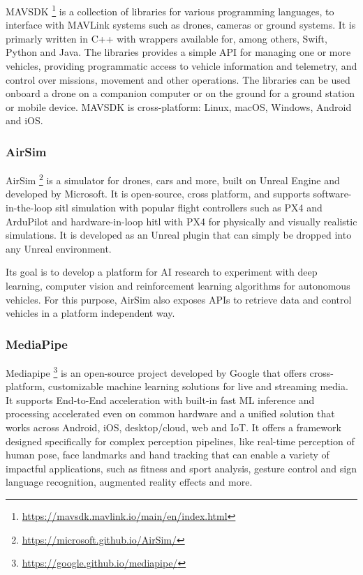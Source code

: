 MAVSDK \footnote{\url{https://mavsdk.mavlink.io/main/en/index.html}} is a collection of libraries for various programming languages,
to interface with MAVLink systems such as drones, cameras or ground systems.
It is primarly written in C++ with wrappers available for,
among others, Swift, Python and Java.
The libraries provides a simple API for managing one or more vehicles, 
providing programmatic access to vehicle information and telemetry, 
and control over missions, movement and other operations.
The libraries can be used onboard a drone on a companion computer
or on the ground for a ground station or mobile device.
MAVSDK is cross-platform: Linux, macOS, Windows, Android and iOS.


\subsubsection{AirSim}
\label{subsec:airsim}
AirSim \footnote{\url{https://microsoft.github.io/AirSim/}} is a simulator for drones, cars and more, built on Unreal Engine and developed by Microsoft. It is open-source, cross platform, and supports software-in-the-loop \gls{sitl} simulation with popular flight controllers such as PX4 and ArduPilot and hardware-in-loop \gls{hitl} with PX4 for physically and visually realistic simulations. It is developed as an Unreal plugin that can simply be dropped into any Unreal environment.

Its goal is to develop a platform for AI research to experiment with deep learning, computer vision and reinforcement learning algorithms for autonomous vehicles. For this purpose, AirSim also exposes APIs to retrieve data and control vehicles in a platform independent way.

\subsubsection{MediaPipe}
\label{subsec:mediapipe}
Mediapipe \footnote{\url{https://google.github.io/mediapipe/}} is an open-source project developed by Google that offers cross-platform, customizable machine learning solutions for live and streaming media.
It supports End-to-End acceleration with built-in fast ML inference and processing accelerated even on common hardware and a unified solution that works across Android, iOS, desktop/cloud, web and IoT.
It offers a framework designed specifically for complex perception pipelines, like real-time perception of human pose, face landmarks and hand tracking that can enable a variety of impactful applications, such as fitness and sport analysis, gesture control and sign language recognition, augmented reality effects and more. 



